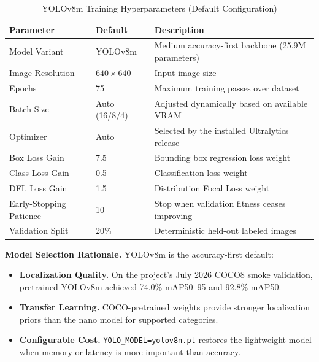 \documentclass[12pt, letterpaper]{article}
\newcommand{\code}[1]{\texttt{\small\colorbox{codebg}{#1}}}
\begin{document}
\begin{table}[H]
  \centering
  \caption{YOLOv8m Training Hyperparameters (Default Configuration)}
  \begin{tabularx}{\linewidth}{@{} l l X @{}}
    \toprule
    \textbf{Parameter}        & \textbf{Default}    & \textbf{Description} \\
    \midrule
    Model Variant             & YOLOv8m             & Medium accuracy-first backbone (25.9M parameters) \\
    Image Resolution          & $640 \times 640$    & Input image size \\
    Epochs                    & 75                  & Maximum training passes over dataset \\
    Batch Size                & Auto (16/8/4)       & Adjusted dynamically based on available VRAM \\
    Optimizer                 & Auto                & Selected by the installed Ultralytics release \\
    Box Loss Gain             & 7.5                 & Bounding box regression loss weight \\
    Class Loss Gain           & 0.5                 & Classification loss weight \\
    DFL Loss Gain             & 1.5                 & Distribution Focal Loss weight \\
    Early-Stopping Patience   & 10                  & Stop when validation fitness ceases improving \\
    Validation Split          & 20\%                & Deterministic held-out labeled images \\
    \bottomrule
  \end{tabularx}
\end{table}

\textbf{Model Selection Rationale.} YOLOv8m is the accuracy-first default:
\begin{itemize}
  \item \textbf{Localization Quality.} On the project's July 2026 COCO8 smoke validation,
    pretrained YOLOv8m achieved 74.0\% mAP50--95 and 92.8\% mAP50.
  \item \textbf{Transfer Learning.} COCO-pretrained weights provide stronger localization
    priors than the nano model for supported categories.
  \item \textbf{Configurable Cost.} \code{YOLO\_MODEL=yolov8n.pt} restores the lightweight
    model when memory or latency is more important than accuracy.
\end{itemize}
\end{document}
